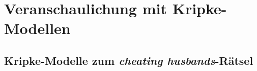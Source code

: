 \section{Veranschaulichung mit Kripke-Modellen}
\label{Kripke-Modelle}
\subsection{Kripke-Modelle zum \textit{cheating husbands}-Rätsel}
